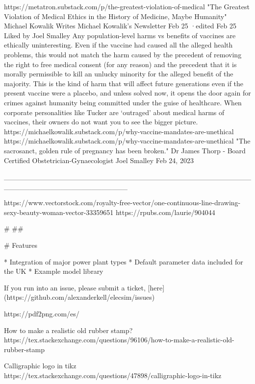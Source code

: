 https://metatron.substack.com/p/the-greatest-violation-of-medical
"The Greatest Violation of Medical Ethics in the History of Medicine, Maybe Humanity"
Michael Kowalik
Writes Michael Kowalik’s Newsletter
Feb 25
·edited Feb 25
Liked by Joel Smalley
Any population-level harms vs benefits of vaccines are ethically uninteresting. Even if the vaccine had caused all the alleged health problems, this would not match the harm caused by the precedent of removing the right to free medical consent (for any reason) and the precedent that it is morally permissible to kill an unlucky minority for the alleged benefit of the majority. This is the kind of harm that will affect future generations even if the present vaccine were a placebo, and unless solved now, it opens the door again for crimes against humanity being committed under the guise of healthcare. When corporate personalities like Tucker are ‘outraged’ about medical harms of vaccines, their owners do not want you to see the bigger picture. https://michaelkowalik.substack.com/p/why-vaccine-mandates-are-unethical
https://michaelkowalik.substack.com/p/why-vaccine-mandates-are-unethical
"The sacrosanct, golden rule of pregnancy has been broken." Dr James Thorp - Board Certified Obstetrician-Gynaecologist
Joel Smalley
Feb 24, 2023












________________________________________________________________________

https://www.vectorstock.com/royalty-free-vector/one-continuous-line-drawing-sexy-beauty-woman-vector-33359651
https://rpubs.com/laurie/904044


#
##

# Features

* Integration of major power plant types
* Default parameter data included for the UK
* Example model library


If you run into an issue, please submit a ticket, [here](https://github.com/alexanderkell/elecsim/issues)


https://pdf2png.com/es/



How to make a realistic old rubber stamp?
https://tex.stackexchange.com/questions/96106/how-to-make-a-realistic-old-rubber-stamp


Calligraphic logo in tikz
https://tex.stackexchange.com/questions/47898/calligraphic-logo-in-tikz

